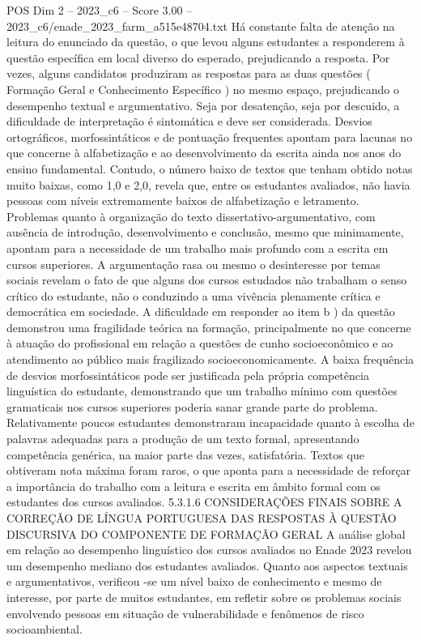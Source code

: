 \begin{textsample}{POS Dim 2 – 2023\_c6 – Score 3.00 – 2023\_c6/enade\_2023\_farm\_a515e48704.txt}
Há constante falta de atenção na leitura do enunciado da questão, o que levou alguns estudantes a responderem à questão específica em local diverso do esperado, prejudicando a resposta.
Por vezes, alguns candidatos produziram as respostas para as duas questões ( Formação Geral e Conhecimento Específico ) no mesmo espaço, prejudicando o desempenho textual e argumentativo.
Seja por desatenção, seja por descuido, a dificuldade de interpretação é sintomática e deve ser considerada.
Desvios ortográficos, morfossintáticos e de pontuação frequentes apontam para lacunas no que concerne à alfabetização e ao desenvolvimento da escrita ainda nos anos do ensino fundamental.
Contudo, o número baixo de textos que tenham obtido notas muito baixas, como 1,0 e 2,0, revela que, entre os estudantes avaliados, não havia pessoas com níveis extremamente baixos de alfabetização e letramento.
Problemas quanto à organização do texto dissertativo-argumentativo, com ausência de introdução, desenvolvimento e conclusão, mesmo que minimamente, apontam para a necessidade de um trabalho mais profundo com a escrita em cursos superiores.
A argumentação rasa ou mesmo o desinteresse por temas sociais revelam o fato de que alguns dos cursos estudados não trabalham o senso crítico do estudante, não o conduzindo a uma vivência plenamente crítica e democrática em sociedade.
A dificuldade em responder ao item b ) da questão demonstrou uma fragilidade teórica na formação, principalmente no que concerne à atuação do profissional em relação a questões de cunho socioeconômico e ao atendimento ao público mais fragilizado socioeconomicamente.
A baixa frequência de desvios morfossintáticos pode ser justificada pela própria competência linguística do estudante, demonstrando que um trabalho mínimo com questões gramaticais nos cursos superiores poderia sanar grande parte do problema.
Relativamente poucos estudantes demonstraram incapacidade quanto à escolha de palavras adequadas para a produção de um texto formal, apresentando competência genérica, na maior parte das vezes, satisfatória.
Textos que obtiveram nota máxima foram raros, o que aponta para a necessidade de reforçar a importância do trabalho com a leitura e escrita em âmbito formal com os estudantes dos cursos avaliados. 5.3.1.6 CONSIDERAÇÕES FINAIS SOBRE A CORREÇÃO DE LÍNGUA PORTUGUESA DAS RESPOSTAS À QUESTÃO DISCURSIVA DO COMPONENTE DE FORMAÇÃO GERAL A análise global em relação ao desempenho linguístico dos cursos avaliados no Enade 2023 revelou um desempenho mediano dos estudantes avaliados.
Quanto aos aspectos textuais e argumentativos, verificou -se um nível baixo de conhecimento e mesmo de interesse, por parte de muitos estudantes, em refletir sobre os problemas sociais envolvendo pessoas em situação de vulnerabilidade e fenômenos de risco socioambiental.

\end{textsample}
